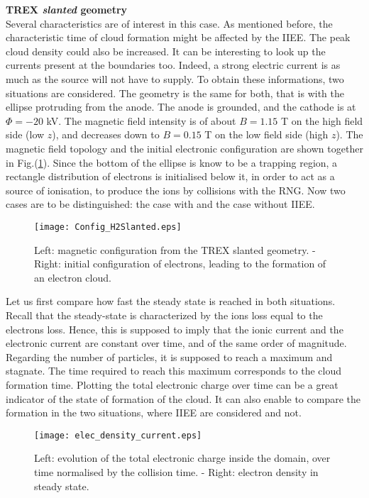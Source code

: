 \textbf{TREX \emph{slanted} geometry}\\

Several characteristics are of interest in this case. As mentioned before, the characteristic time of cloud formation might be affected by the IIEE. The peak cloud density could also be increased. It can be interesting to look up the currents present at the boundaries too. Indeed, a strong electric current is as much as the source will not have to supply. To obtain these informations, two situations are considered. The geometry is the same for both, that is with the ellipse protruding from the anode. The anode is grounded, and the cathode is at $\Phi = -20$ kV. The magnetic field intensity is of about $B = 1.15$ T on the high field side (low $z$), and decreases down to $B=0.15$ T on the low field side (high $z$). The magnetic field topology and the initial electronic configuration are shown together in Fig.(\ref{Config_mag_Slanted}). Since the bottom of the ellipse is know to be a trapping region, a rectangle distribution of electrons is initialised below it, in order to act as a source of ionisation, to produce the ions by collisions with the RNG. Now two cases are to be distinguished: the case with and the case without IIEE.\\

\begin{figure}[h!]
\centering
	\texttt{[image: Config\_H2Slanted.eps]}
	\caption{\label{Config_mag_Slanted} Left: magnetic configuration from the TREX slanted geometry. - Right: initial configuration of electrons, leading to the formation of an electron cloud.}
\end{figure}  


Let us first compare how fast the steady state is reached in both situations. Recall that the steady-state is characterized by the ions loss equal to the electrons loss. Hence, this is supposed to imply that the ionic current and the electronic current are constant over time, and of the same order of magnitude. Regarding the number of particles, it is supposed to reach a maximum and stagnate. The time required to reach this maximum corresponds to the cloud formation time. Plotting the total electronic charge over time can be a great indicator of the state of formation of the cloud. It can also enable to compare the formation in the two situations, where IIEE are considered and not. \\

\begin{figure}[h!]
\centering
	\texttt{[image: elec\_density\_current.eps]}
	\caption{\label{elec_density_current} Left: evolution of the total electronic charge inside the domain, over time normalised by the collision time. - Right: electron density in steady state.}
\end{figure}  

